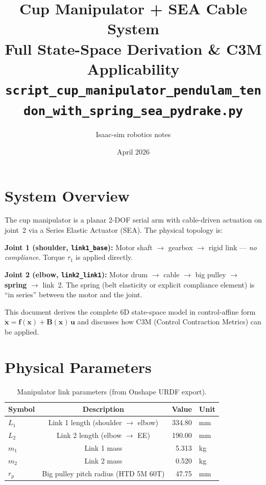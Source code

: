 \documentclass[11pt, a4paper]{article}
\title{\textbf{Cup Manipulator + SEA Cable System}\\[4pt]
       \textbf{Full State-Space Derivation \& C3M Applicability}\\[6pt]
       \large \texttt{script\_cup\_manipulator\_pendulam\_tendon\_with\_spring\_sea\_pydrake.py}}
\date{April 2026}
\author{Isaac-sim robotics notes}
\newcommand{\bu}{\bm{u}}
\newcommand{\bx}{\bm{x}}
\newcommand{\bB}{\bm{B}}
\begin{document}
\maketitle
\tableofcontents
\newpage

\section{System Overview}

The cup manipulator is a planar 2-DOF serial arm with cable-driven actuation
on joint~2 via a Series Elastic Actuator (SEA).  The physical topology is:

\begin{mdframed}
\textbf{Joint 1 (shoulder, \texttt{link1\_base}):}
Motor shaft $\to$ gearbox $\to$ rigid link --- \emph{no compliance}.
Torque $\tau_1$ is applied directly.

\medskip
\textbf{Joint 2 (elbow, \texttt{link2\_link1}):}
Motor drum $\to$ cable $\to$ big pulley $\to$ \textbf{spring} $\to$ link~2.
The spring (belt elasticity or explicit compliance element) is ``in series''
between the motor and the joint.
\end{mdframed}

This document derives the complete 6D state-space model in control-affine form
$\dot{\bx} = \bm{f}(\bx) + \bB(\bx)\,\bu$
and discusses how C3M (Control Contraction Metrics) can be applied.


\section{Physical Parameters}
\label{sec:params}

\begin{table}[h]
\centering
\caption{Manipulator link parameters (from Onshape URDF export).}
\label{tab:links}
\begin{tabular}{@{}lcrl@{}}
\toprule
Symbol & Description & Value & Unit \\
\midrule
$L_1$   & Link 1 length (shoulder $\to$ elbow) & 334.80 & mm \\
$L_2$   & Link 2 length (elbow $\to$ EE)       & 190.00 & mm \\
$m_1$   & Link 1 mass                          & 5.313  & kg \\
$m_2$   & Link 2 mass                          & 0.520  & kg \\
$r_p$   & Big pulley pitch radius (HTD 5M 60T) & 47.75  & mm \\
\bottomrule
\end{tabular}
\end{table}
\end{document}
